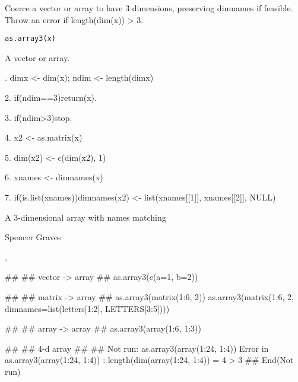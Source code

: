 \begin{Description}\relax
Coerce a vector or array to have 3 dimensions, preserving dimnames if
feasible.  Throw an error if length(dim(x)) > 3.
\end{Description}
\begin{Usage}
\begin{verbatim}
as.array3(x) 
\end{verbatim}
\end{Usage}
\begin{Arguments}
\begin{ldescription}
\item[\code{x}] A vector or array.  

\end{ldescription}
\end{Arguments}
\begin{Details}.  dimx <- dim(x);  ndim <- length(dimx) 

2.  if(ndim==3)return(x).

3.  if(ndim>3)stop.

4.  x2 <- as.matrix(x)

5.  dim(x2) <- c(dim(x2), 1)

6.  xnames <- dimnames(x)

7.  if(is.list(xnames))dimnames(x2) <- list(xnames[[1]], xnames[[2]],
NULL)
\end{Details}
\begin{Value}
A 3-dimensional array with names matching 
\end{Value}
\begin{Author}\relax
Spencer Graves
\end{Author}
\begin{SeeAlso}\relax
{},
\end{SeeAlso}
\begin{Examples}
\begin{ExampleCode}
##
## vector -> array 
##
as.array3(c(a=1, b=2)) 

##
## matrix -> array 
##
as.array3(matrix(1:6, 2))
as.array3(matrix(1:6, 2, dimnames=list(letters[1:2], LETTERS[3:5]))) 

##
## array -> array 
##
as.array3(array(1:6, 1:3)) 

##
## 4-d array 
##
## Not run: 
as.array3(array(1:24, 1:4)) 
Error in as.array3(array(1:24, 1:4)) : 
  length(dim(array(1:24, 1:4)) = 4 > 3
## End(Not run)
\end{ExampleCode}
\end{Examples}

